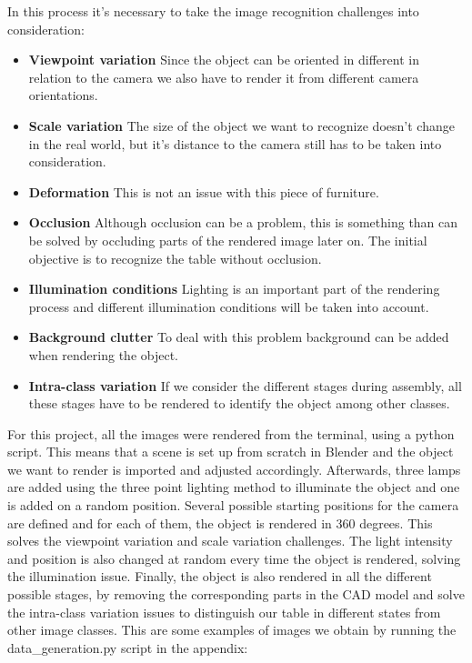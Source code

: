 \documentclass[10pt,a4paper]{article}
\begin{document}
In this process it's necessary to take the image recognition challenges into consideration:
\begin{itemize}
\item \textbf{Viewpoint variation} Since the object can be oriented in different in relation to the camera we also have to render it from different camera orientations.
\item \textbf{Scale variation} The size of the object we want to recognize doesn't change in the real world, but it's distance to the camera still has to be taken into consideration.
\item \textbf{Deformation} This is not an issue with this piece of furniture.
\item \textbf{Occlusion} Although occlusion can be a problem, this is something than can be solved by occluding parts of the rendered image later on. The initial objective is to recognize the table without occlusion.
\item \textbf{Illumination conditions} Lighting is an important part of the rendering process and different illumination conditions will be taken into account.
\item \textbf{Background clutter} To deal with this problem background can be added when rendering the object.
\item \textbf{Intra-class variation} If we consider the different stages during assembly, all these stages have to be rendered to identify the object among other classes.
\end{itemize}
For this project, all the images were rendered from the terminal, using a python script. This means that a scene is set up from scratch in Blender and the object we want to render is imported and adjusted accordingly. Afterwards, three lamps are added using the three point lighting method to illuminate the object and one is added on a random position. Several possible starting positions for the camera are defined and for each of them, the object is rendered in 360 degrees. This solves the viewpoint variation and scale variation challenges. The light intensity and position is also changed at random every time the object is rendered, solving the illumination issue. Finally, the object is also rendered in all the different possible stages, by removing the corresponding parts in the CAD model and solve the intra-class variation issues to distinguish our table in different states from other image classes. This are some examples of images we obtain by running the data\_generation.py script in the appendix:
\end{document}
